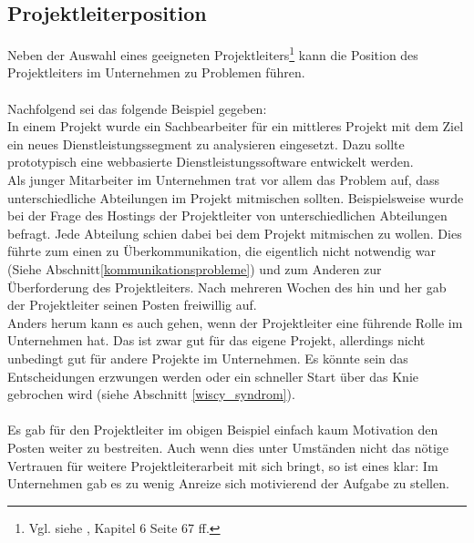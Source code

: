 \documentclass[11pt]{scrartcl}
\begin{document}
\subsection{Projektleiterposition}

Neben der Auswahl eines geeigneten Projektleiters\footnote{Vgl. siehe \cite{proj_zum_erfolg_fuehren}, Kapitel 6 Seite 67 ff.} kann die Position des Projektleiters im Unternehmen zu Problemen führen.\\ 
\\
Nachfolgend sei das folgende Beispiel gegeben:\\
In einem Projekt wurde ein Sachbearbeiter für ein mittleres Projekt mit dem Ziel ein neues Dienstleistungssegment zu analysieren eingesetzt. Dazu sollte prototypisch eine webbasierte Dienstleistungssoftware entwickelt werden.\\
Als junger Mitarbeiter im Unternehmen trat vor allem das Problem auf, dass unterschiedliche Abteilungen im Projekt mitmischen sollten. Beispielsweise wurde bei der Frage des Hostings der Projektleiter von unterschiedlichen Abteilungen befragt. Jede Abteilung schien dabei bei dem Projekt mitmischen zu wollen. Dies führte zum einen zu Überkommunikation, die eigentlich nicht notwendig war (Siehe Abschnitt\ref{kommunikationsprobleme}) und zum Anderen zur Überforderung des Projektleiters. Nach mehreren Wochen des hin und her gab der Projektleiter seinen Posten freiwillig auf.\\
Anders herum kann es auch gehen, wenn der Projektleiter eine führende Rolle im Unternehmen hat. Das ist zwar gut für das eigene Projekt, allerdings nicht unbedingt gut für andere Projekte im Unternehmen. Es könnte sein das Entscheidungen erzwungen werden oder ein schneller Start über das Knie gebrochen wird (siehe Abschnitt \ref{wiscy_syndrom}).\\
\\
Es gab für den Projektleiter im obigen Beispiel einfach kaum Motivation den Posten weiter zu bestreiten. Auch wenn dies unter Umständen nicht das nötige Vertrauen für weitere Projektleiterarbeit mit sich bringt, so ist eines klar: Im Unternehmen gab es zu wenig Anreize sich motivierend der Aufgabe zu stellen.  


\pagebreak
\end{document}
